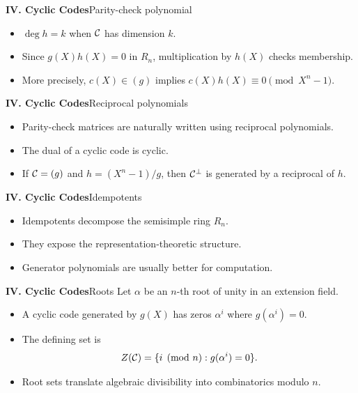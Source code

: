 \begin{frame}{\textbf{IV. Cyclic Codes}}{Parity-check polynomial}
\small
{}
\begin{itemize}
  \item $\deg h=k$ when $\mathcal{C}$ has dimension $k$.
  \item Since $g(X)h(X)=0$ in $R_n$, multiplication by $h(X)$ checks membership.
  \item More precisely, $c(X)\in(g)$ implies $c(X)h(X)\equiv0\pmod{X^n-1}$.
\end{itemize}
\end{frame}

\begin{frame}{\textbf{IV. Cyclic Codes}}{Reciprocal polynomials}
\small
{}
\begin{itemize}
  \item Parity-check matrices are naturally written using reciprocal polynomials.
  \item The dual of a cyclic code is cyclic.
  \item If $\mathcal{C}=(g)$ and $h=(X^n-1)/g$, then $\mathcal{C}^\perp$ is generated by a reciprocal of $h$.
\end{itemize}
\end{frame}

\begin{frame}{\textbf{IV. Cyclic Codes}}{Idempotents}
\small
{}
\begin{itemize}
  \item Idempotents decompose the semisimple ring $R_n$.
  \item They expose the representation-theoretic structure.
  \item Generator polynomials are usually better for computation.
\end{itemize}
\end{frame}

\begin{frame}{\textbf{IV. Cyclic Codes}}{Roots}
\small
Let $\alpha$ be an $n$-th root of unity in an extension field.
\begin{itemize}
  \item A cyclic code generated by $g(X)$ has zeros $\alpha^i$ where $g(\alpha^i)=0$.
  \item The defining set is
  \[
    Z(\mathcal{C})=\{i\pmod n:g(\alpha^i)=0\}.
  \]
  \item Root sets translate algebraic divisibility into combinatorics modulo $n$.
\end{itemize}
\end{frame}

